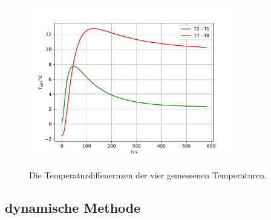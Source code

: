 \begin{figure}
\centering
\caption{Die Temperaturdiffenernzen der vier gemessenen Temperaturen.}
\includegraphics[width = 0.8\textwidth]{content/data/statsisch_vergleich.pdf}
\label{fig:stat_vergleich}
\end{figure}
\FloatBarrier

\subsection{dynamische Methode}

